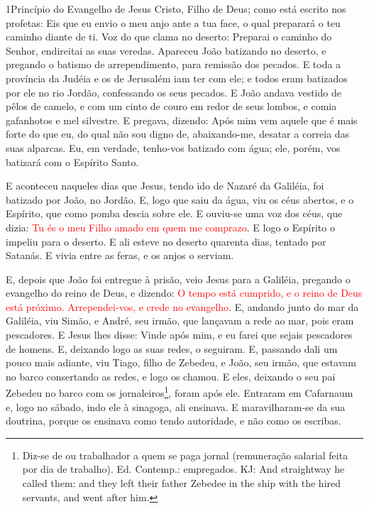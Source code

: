 
\lettrine{1} Princípio do Evangelho de Jesus Cristo, Filho de
Deus; como está escrito nos profetas: Eis que eu envio o meu
anjo ante a tua face, o qual preparará o teu caminho diante de ti.
Voz do que clama no deserto: Preparai o caminho do Senhor,
endireitai as suas veredas. Apareceu João batizando no deserto,
e pregando o batismo de arrependimento, para remissão dos pecados.
E toda a província da Judéia e os de Jerusalém iam ter com ele;
e todos eram batizados por ele no rio Jordão, confessando os seus
pecados. E João andava vestido de pêlos de camelo, e com um
cinto de couro em redor de seus lombos, e comia gafanhotos e mel
silvestre. E pregava, dizendo: Após mim vem aquele que é mais
forte do que eu, do qual não sou digno de, abaixando-me, desatar a
correia das suas alparcas. Eu, em verdade, tenho-vos batizado
com água; ele, porém, vos batizará com o Espírito Santo.

E aconteceu naqueles dias que Jesus, tendo ido de Nazaré da
Galiléia, foi batizado por João, no Jordão. E, logo que saiu
da água, viu os céus abertos, e o Espírito, que como pomba descia
sobre ele. E ouviu-se uma voz dos céus, que dizia: \textcolor{red}{Tu
és o meu Filho amado em quem me comprazo}. E logo o Espírito
o impeliu para o deserto. E ali esteve no deserto quarenta
dias, tentado por Satanás. E vivia entre as feras, e os anjos o
serviam.

E, depois que João foi entregue à prisão, veio Jesus para a
Galiléia, pregando o evangelho do reino de Deus, e dizendo:
\textcolor{red}{O tempo está cumprido, e o reino de Deus está próximo.
Arrependei-vos, e crede no evangelho}. E, andando junto do
mar da Galiléia, viu Simão, e André, seu irmão, que lançavam a rede
ao mar, pois eram pescadores. E Jesus lhes disse: Vinde após
mim, e eu farei que sejais pescadores de homens. E, deixando
logo as suas redes, o seguiram. E, passando dali um pouco
mais adiante, viu Tiago, filho de Zebedeu, e João, seu irmão, que
estavam no barco consertando as redes, e logo os chamou. E
eles, deixando o seu pai Zebedeu no barco com os
jornaleiros\footnote{Diz-se de ou trabalhador a quem se paga jornal
(remuneração salarial feita por dia de trabalho). Ed. Contemp.:
empregados. KJ: And straightway he called them: and they left their
father Zebedee in the ship with the hired servants, and went after
him.}, foram após ele. Entraram em Cafarnaum e, logo no
sábado, indo ele à sinagoga, ali ensinava. E maravilharam-se
da sua doutrina, porque os ensinava como tendo autoridade, e não
como os escribas.

